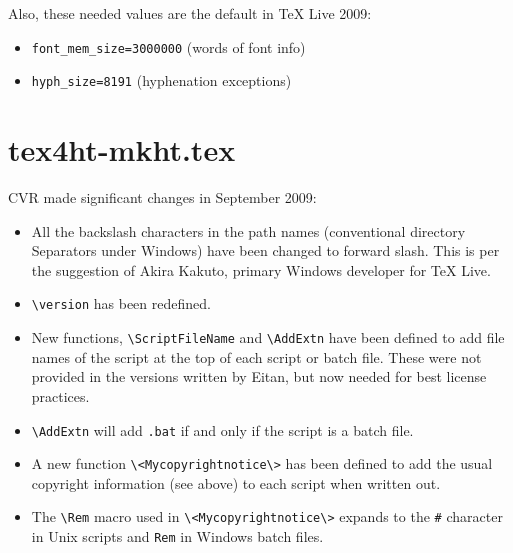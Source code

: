 Also, these needed values are the default in \TeX{} Live 2009:
\begin{itemize}
\item \Verb|font_mem_size=3000000| (words of font info)
\item \Verb|hyph_size=8191| (hyphenation exceptions)
\end{itemize}


\section{tex4ht-mkht.tex}

CVR made significant changes in September 2009:

\begin{itemize}

\item All the backslash characters in the path names (conventional directory
Separators under Windows) have been changed to forward slash.  This is
per the suggestion of Akira Kakuto, primary Windows developer for
\TeX{} Live.

\item \Verb=\version= has been redefined.

\item New functions, \Verb=\ScriptFileName= and \Verb=\AddExtn= have
been defined to add file names of the script at the top of each script
or batch file.  These were not provided in the versions written by
Eitan, but now needed for best license practices.

\item \Verb=\AddExtn= will add \Verb=.bat= if and only if the script
is a batch file.

\item A new function \Verb=\<Mycopyrightnotice\>= has been defined to
add the usual copyright information (see above) to
each script when written out.

\item The \Verb=\Rem= macro used in \Verb=\<Mycopyrightnotice\>=
expands to the \Verb=#= character in Unix scripts and \Verb=Rem= in
Windows batch files.

\end{itemize}
